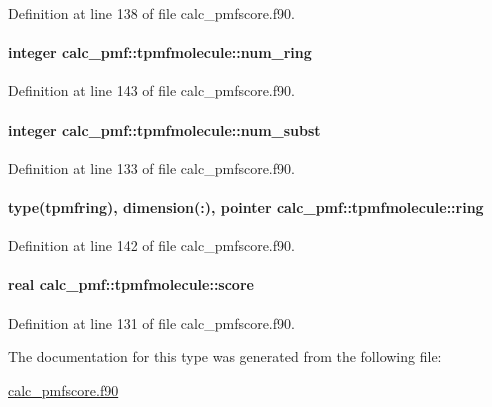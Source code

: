 Definition at line 138 of file calc\-\_\-pmfscore.\-f90.

\hypertarget{structcalc__pmf_1_1tpmfmolecule_a7e54abada41932601b8767941b203339}{
\paragraph[{num\-\_\-ring}]{\setlength{\rightskip}{0pt plus 5cm}integer calc\-\_\-pmf\-::tpmfmolecule\-::num\-\_\-ring}}\label{structcalc__pmf_1_1tpmfmolecule_a7e54abada41932601b8767941b203339}


Definition at line 143 of file calc\-\_\-pmfscore.\-f90.

\hypertarget{structcalc__pmf_1_1tpmfmolecule_abfce8e0b4581e25b14c515ecd1fd1f2d}{
\paragraph[{num\-\_\-subst}]{\setlength{\rightskip}{0pt plus 5cm}integer calc\-\_\-pmf\-::tpmfmolecule\-::num\-\_\-subst}}\label{structcalc__pmf_1_1tpmfmolecule_abfce8e0b4581e25b14c515ecd1fd1f2d}


Definition at line 133 of file calc\-\_\-pmfscore.\-f90.

\hypertarget{structcalc__pmf_1_1tpmfmolecule_a25e7120480983ec1f014797fcb3d30af}{
\paragraph[{ring}]{\setlength{\rightskip}{0pt plus 5cm}type({\bf tpmfring}), dimension(\-:), pointer calc\-\_\-pmf\-::tpmfmolecule\-::ring}}\label{structcalc__pmf_1_1tpmfmolecule_a25e7120480983ec1f014797fcb3d30af}


Definition at line 142 of file calc\-\_\-pmfscore.\-f90.

\hypertarget{structcalc__pmf_1_1tpmfmolecule_a7dd9a97a6c26f2274b83db57dbe72959}{
\paragraph[{score}]{\setlength{\rightskip}{0pt plus 5cm}real calc\-\_\-pmf\-::tpmfmolecule\-::score}}\label{structcalc__pmf_1_1tpmfmolecule_a7dd9a97a6c26f2274b83db57dbe72959}


Definition at line 131 of file calc\-\_\-pmfscore.\-f90.



The documentation for this type was generated from the following file\-:\begin{DoxyCompactItemize}
\item 
\hyperlink{calc__pmfscore_8f90}{calc\-\_\-pmfscore.\-f90}\end{DoxyCompactItemize}
